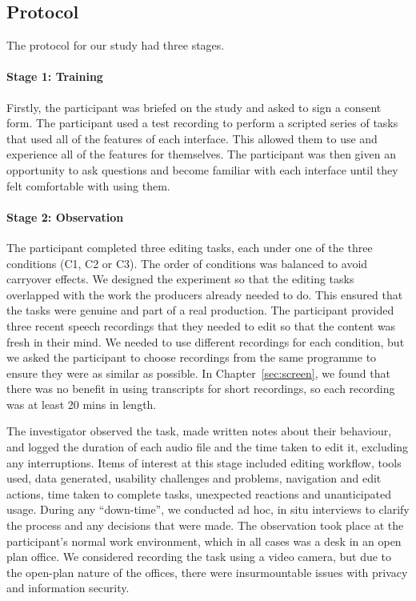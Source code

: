 \subsection{Protocol}

The protocol for our study had three stages.

\paragraph{Stage 1: Training}

Firstly, the participant was briefed on the study and asked to sign a consent form.  The participant used a test
recording to perform a scripted series of tasks that used all of the features of each interface.  This allowed them to
use and experience all of the features for themselves. The participant was then given an opportunity to ask questions
and become familiar with each interface until they felt comfortable with using them.

\paragraph{Stage 2: Observation}

The participant completed three editing tasks, each under one of the three conditions (C1, C2 or C3).  The order of
conditions was balanced to avoid carryover effects.  We designed the experiment so that the editing tasks
overlapped with the work the producers already needed to do. This ensured that the tasks were genuine and part of a
real production.  The participant provided three recent speech recordings that they needed to edit so that the content
was fresh in their mind.  We needed to use different recordings for each condition, but we asked the participant to
choose recordings from the same programme to ensure they were as similar as possible.  In Chapter~\ref{sec:screen}, we
found that there was no benefit in using transcripts for short recordings, so each recording was at least 20 mins in
length. 
 
The investigator observed the task, made written notes about their behaviour, and logged the duration of each audio
file and the time taken to edit it, excluding any interruptions.  Items of interest at this stage included editing
workflow, tools used, data generated, usability challenges and problems, navigation and edit actions, time taken to
complete tasks, unexpected reactions and unanticipated usage. During any ``down-time'', we conducted ad hoc, in situ
interviews to clarify the process and any decisions that were made.  The observation took place at the participant's
normal work environment, which in all cases was a desk in an open plan office.  We considered recording the task using
a video camera, but due to the open-plan nature of the offices, there were insurmountable issues with privacy and
information security.

